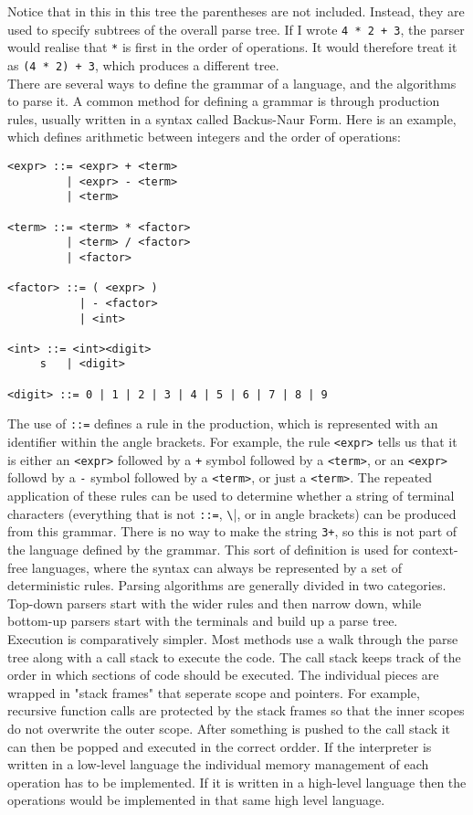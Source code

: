 \documentclass[a4paper, 12pt]{article}
\begin{document}
Notice that in this in this tree the parentheses are not included. Instead, they are used to specify subtrees of the overall parse tree. If I wrote \verb|4 * 2 + 3|, the parser would realise that \verb|*| is first in the order of operations. It would therefore treat it as \verb|(4 * 2) + 3|, which produces a different tree.
\\
There are several ways to define the grammar of a language, and the algorithms to parse it. A common method for defining a grammar is through production rules, usually written in a syntax called Backus-Naur Form. Here is an example, which defines arithmetic between integers and the order of operations:
\begin{verbatim}
<expr> ::= <expr> + <term>
         | <expr> - <term>
         | <term>

<term> ::= <term> * <factor>
         | <term> / <factor>
         | <factor>

<factor> ::= ( <expr> )
           | - <factor>
           | <int>

<int> ::= <int><digit>
     s   | <digit>

<digit> ::= 0 | 1 | 2 | 3 | 4 | 5 | 6 | 7 | 8 | 9
\end{verbatim}

The use of \verb|::=| defines a rule in the production, which is represented with an identifier within the angle brackets. For example, the rule \verb|<expr>| tells us that it is either an \verb|<expr>| followed by a \verb|+| symbol followed by a \verb|<term>|, or an \verb|<expr>| followd by a \verb|-| symbol followed by a \verb|<term>|, or just a \verb|<term>|. The repeated application of these rules can be used to determine whether a string of terminal characters (everything that is not \verb|::=|, \verb|\||, or in angle brackets) can be produced from this grammar. There is no way to make the string \verb|3+|, so this is not part of the language defined by the grammar. This sort of definition is used for context-free languages, where the syntax can always be represented by a set of deterministic rules. Parsing algorithms are generally divided in two categories. Top-down parsers start with the wider rules and then narrow down, while bottom-up parsers start with the terminals and build up a parse tree.\\

Execution is comparatively simpler. Most methods use a walk through the parse tree along with a call stack to execute the code. The call stack keeps track of the order in which sections of code should be executed. The individual pieces are wrapped in "stack frames" that seperate scope and pointers. For example, recursive function calls are protected by the stack frames so that the inner scopes do not overwrite the outer scope. After something is pushed to the call stack it can then be popped and executed in the correct ordder. If the interpreter is written in a low-level language the individual memory management of each operation has to be implemented. If it is written in a high-level language then the operations would be implemented in that same high level language.\\
\end{document}
